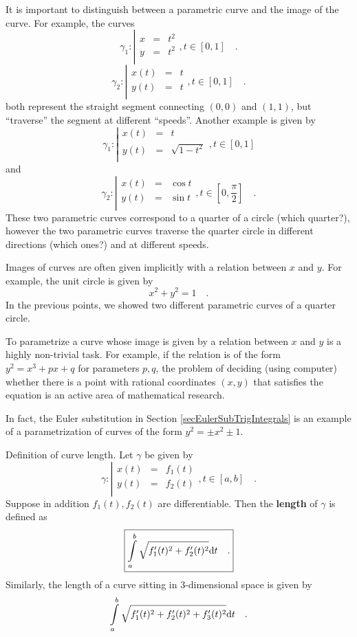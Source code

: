\documentclass[12pt]{book}
\renewcommand{\emph}{\textbf}
\begin{document}
It is important to distinguish between a parametric curve and the image of the curve. For example, the curves
\[
\gamma_1:\left|
\begin{array}{rcl}
x&=&t^2\\
y&=&t^2\\
\end{array}\right., t\in [0,1]\quad .
\]
\[\gamma_2:\left|
\begin{array}{rcl}
x(t)&=&t\\
y(t)&=&t\\
\end{array}\right., t\in [0,1]\quad .
\]
both represent the straight segment connecting $(0,0)$ and $(1,1)$, but ``traverse'' the segment at different ``speeds''. Another example is given by
\[
\gamma_1:\left|
\begin{array}{rcl}
x(t)&=&t\\
y(t)&=&\sqrt{1-t^2}\\
\end{array}\right., t\in [0,1]
\]
and
\[
\gamma_2:\left|
\begin{array}{rcl}
x(t)&=&\cos t\\
y(t)&=&\sin t\\
\end{array}\right., t\in [0, \frac{\pi}{2}]\quad .
\]
These two parametric curves correspond to a quarter of a circle (which quarter?), however the two parametric curves traverse the quarter circle in different directions (which ones?) and at different speeds.

Images of curves are often given implicitly with a relation between $x$ and $y$. For example, the unit circle is given by
\[
x^2+y^2=1\quad .
\]
In the previous points, we showed two different parametric curves of a quarter circle.

To parametrize a curve whose image is given by a relation between $x$ and $y$ is a highly non-trivial task. For example, if the relation is of the form $y^2=x^3+px+q$ for parameters $p,q$, the problem of deciding (using computer) whether there is a point with rational coordinates $(x,y)$ that satisfies the equation is an active area of mathematical research. %

In fact, the Euler substitution in Section \ref{secEulerSubTrigIntegrals} is an example of a parametrization of curves of the form $y^2=\pm x^2\pm 1$.

Definition of curve length. Let $\gamma$ be given by
\[
\gamma:\left|
\begin{array}{rcl}
x(t)&=&f_1(t)\\
y(t)&=&f_2(t)\\
\end{array}\right., t\in [a,b]\quad .
\]
Suppose in addition $f_1(t), f_2(t)$ are differentiable. Then the \emph{length} of $\gamma$ is defined as
\begin{equation}\boxed{
\label{eqDefLengthCurve}
\int\limits_{a}^b \sqrt{f_1'(t)^2+f_2'(t)^2}{\normalfont \text{d}} t \quad .
}
\end{equation}
Similarly, the length of a curve sitting in 3-dimensional space is given by
\[
\int\limits_{a}^b \sqrt{f_1'(t)^2+f_2'(t)^2+f_3'(t)^2}{\normalfont \text{d}} t \quad .
\]
\end{document}
